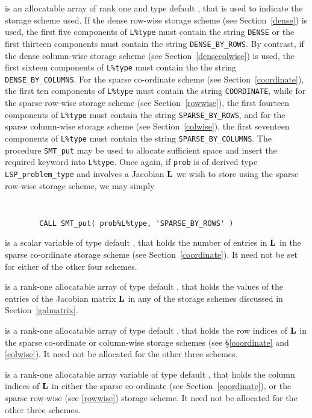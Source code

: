 \documentclass{galahad}
\newcommand{\packagename}{LSP}
\begin{document}
\begin{description}
\begin{description}
 is an allocatable array of rank one and type default \character, 
that is used to indicate the storage scheme used. If the dense row-wise 
storage scheme (see Section~\ref{dense}) is used, 
the first five components of {\tt L\%type} must contain the
string {\tt DENSE} or the first thirteen components must contain the
string {\tt DENSE\_BY\_ROWS}.
By contrast, if the dense column-wise storage scheme 
(see Section~\ref{densecolwise}) is used, 
the first sixteen components of {\tt L\%type} must contain the
the string {\tt DENSE\_BY\_COLUMNS}.
For the sparse co-ordinate scheme (see Section~\ref{coordinate}), 
the first ten components of {\tt L\%type} must contain the
string {\tt COORDINATE}, while 
for the sparse row-wise storage scheme (see Section~\ref{rowwise}),
the first fourteen components of {\tt L\%type} must contain the
string {\tt SPARSE\_BY\_ROWS},
and for the sparse column-wise storage scheme (see Section~\ref{colwise}),
the first seventeen components of {\tt L\%type} must contain the
string {\tt SPARSE\_BY\_COLUMNS}.
The procedure {\tt SMT\_put} may be used to allocate sufficient space and 
insert the required keyword into {\tt L\%type}.
Once again, if {\tt prob} is of derived type {\tt \packagename\_problem\_type}
and involves a Jacobian ${\mathbf{L}}$ we wish to store using the sparse row-wise 
storage scheme, we may simply
{\tt 
\begin{verbatim}
        CALL SMT_put( prob%L%type, 'SPARSE_BY_ROWS' )
\end{verbatim}
}
\noindent

 is a scalar variable of type default \integer, that 
holds the number of entries in ${\mathbf{L}}$
in the sparse co-ordinate storage scheme (see Section~\ref{coordinate}). 
It need not be set for either of the other four schemes.

 is a rank-one allocatable array of type default \realdp, that holds
the values of the entries of the Jacobian matrix ${\mathbf{L}}$ in any of the 
storage schemes discussed in Section~\ref{galmatrix}.

 is a rank-one allocatable array of type default \integer,
that holds the row indices of ${\mathbf{L}}$ in the sparse co-ordinate 
or column-wise storage schemes (see \S\ref{coordinate} and \ref{colwise}).
It need not be allocated for the other three schemes.

 is a rank-one allocatable array variable of type default \integer,
that holds the column indices of ${\mathbf{L}}$ in either the sparse co-ordinate 
(see Section~\ref{coordinate}), or the sparse row-wise 
(see \ref{rowwise}) storage scheme.
It need not be allocated for the other three schemes.


\end{description}
\end{description}
\end{document}
